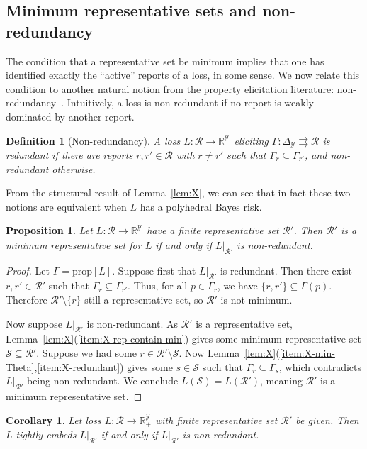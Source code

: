 \documentclass[11pt]{article}
\newcommand{\reals}{\mathbb{R}}
\newcommand{\prop}[1]{\mathrm{prop}[#1]}
\newcommand{\simplex}{\Delta_\Y}
\newcommand{\R}{\mathcal{R}}
\newcommand{\Sc}{\mathcal{S}}
\newcommand{\Y}{\mathcal{Y}}
\newcommand{\toto}{\rightrightarrows}
\newtheorem{proposition}{Proposition}
\newtheorem{corollary}{Corollary}
\newtheorem{definition}{Definition}
\begin{document}
\subsection{Minimum representative sets and non-redundancy}

The condition that a representative set be minimum implies that one has identified exactly the ``active'' reports of a loss, in some sense.
We now relate this condition to another natural notion from the property elicitation literature: non-redundancy~\cite{frongillo2014general,lambert2018elicitation}.
Intuitively, a loss is non-redundant if no report is weakly dominated by another report.

\begin{definition}[Non-redundancy]\label{def:nonredundant}
  A loss $L : \R \to \reals^\Y_+$ eliciting $\Gamma:\simplex \toto \R$ is \emph{redundant} if there are reports $r, r' \in \R$ with $r \neq r'$ such that $\Gamma_r \subseteq \Gamma_{r'}$, and \emph{non-redundant} otherwise.
\end{definition}

From the structural result of Lemma~\ref{lem:X}, we can see that in fact these two notions are equivalent when $L$ has a polyhedral Bayes risk.
\begin{proposition}\label{prop:tfae-min-rep-nonredundant}
  Let $L:\R\to\reals^\Y_+$ have a finite representative set $\R'$.
  Then $\R'$ is a minimum representative set for $L$ if and only if $L|_{\R'}$ is non-redundant.
\end{proposition}
\begin{proof}
  Let $\Gamma = \prop{L}$.
  Suppose first that $L|_{\R'}$ is redundant.
  Then there exist $r,r' \in \R'$ such that $\Gamma_r \subseteq \Gamma_{r'}$.
  Thus, for all $p \in \Gamma_r$, we have $\{r, r'\} \subseteq \Gamma(p)$.
  Therefore $\R' \setminus \{r\}$ still a representative set, so $\R'$ is not minimum.

  Now suppose $L|_{\R'}$ is non-redundant.
  As $\R'$ is a representative set, Lemma~\ref{lem:X}(\ref{item:X-rep-contain-min}) gives some minimum representative set $\Sc \subseteq \R'$.
  Suppose we had some $r \in \R' \setminus \Sc$.
  Now Lemma~\ref{lem:X}(\ref{item:X-min-Theta},\ref{item:X-redundant}) gives some $s\in\Sc$ such that $\Gamma_r \subseteq \Gamma_s$, which contradicts $L|_{\R'}$ being non-redundant.
  We conclude $L(\Sc)=L(\R')$, meaning $\R'$ is a minimum representative set.
\end{proof}

\begin{corollary}\label{cor:tight-embed-min-rep}
  Let loss $L:\R\to\reals^\Y_+$ with finite representative set $\R'$ be given.
  Then $L$ tightly embeds $L|_{\R'}$ if and only if $L|_{\R'}$ is non-redundant.
\end{corollary}
\end{document}
